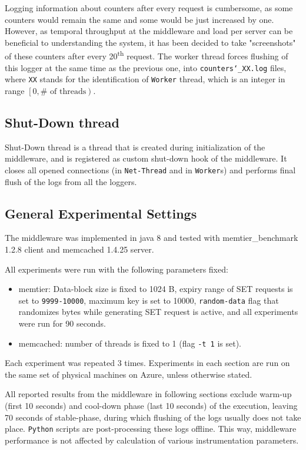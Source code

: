 \documentclass[11pt,a4paper]{article}
\begin{document}
Logging information about counters after every request is cumbersome, as some counters would remain the same and some would be just increased by one. However, as temporal throughput at the middleware and load per server can be beneficial to understanding the system, it has been decided to take "screenshots" of these counters after every 20\textsuperscript{th} request. The worker thread forces flushing of this logger at the same time as the previous one, into \texttt{counters\char`_XX.log} files, where \texttt{XX} stands for the identification of \texttt{Worker} thread, which is an integer in range $\left[0, \#\text{ of threads}\right)$.

\subsection{Shut-Down thread}

Shut-Down thread is a thread that is created during initialization of the middleware, and is registered as custom shut-down hook of the middleware. It closes all opened connections (in \texttt{Net-Thread} and in \texttt{Worker}s) and performs final flush of the logs from all the loggers.

\subsection{General Experimental Settings}

The middleware was implemented in java 8 and tested with memtier\_benchmark 1.2.8 client and memcached 1.4.25 server.

All experiments were run with the following parameters fixed: 
\begin{itemize}
	\item memtier: Data-block size is fixed to 1024 B, expiry range of SET requests is set to \texttt{9999-10000}, maximum key is set to 10000, \texttt{random-data} flag that randomizes bytes while generating SET request is active, and all experiments were run for 90 seconds.
	\item memcached: number of threads is fixed to 1 (flag \texttt{-t 1} is set).
\end{itemize}
Each experiment was repeated 3 times. Experiments in each section are run on the same set of physical machines on Azure, unless otherwise stated.

All reported results from the middleware in following sections exclude warm-up (first 10 seconds) and cool-down phase (last 10 seconds) of the execution, leaving 70 seconds of stable-phase, during which flushing of the logs usually does not take place. \texttt{Python} scripts are post-processing these logs offline. This way, middleware performance is not affected by calculation of various instrumentation parameters.
\end{document}
